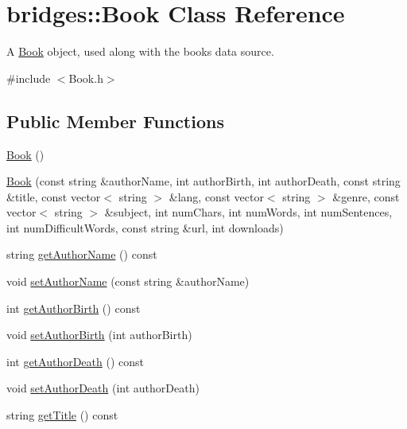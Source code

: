 \hypertarget{classbridges_1_1_book}{}\section{bridges\+:\+:Book Class Reference}
\label{classbridges_1_1_book}


A \mbox{\hyperlink{classbridges_1_1_book}{Book}} object, used along with the books data source.  




{\ttfamily \#include $<$Book.\+h$>$}

\subsection*{Public Member Functions}
\begin{DoxyCompactItemize}
\item 
\mbox{\hyperlink{classbridges_1_1_book_abb2903c640bd263a2e077d52e12a773e}{Book}} ()
\item 
\mbox{\hyperlink{classbridges_1_1_book_a4256eb5015b42e511d950c45103cef63}{Book}} (const string \&author\+Name, int author\+Birth, int author\+Death, const string \&title, const vector$<$ string $>$ \&lang, const vector$<$ string $>$ \&genre, const vector$<$ string $>$ \&subject, int num\+Chars, int num\+Words, int num\+Sentences, int num\+Difficult\+Words, const string \&url, int downloads)
\item 
string \mbox{\hyperlink{classbridges_1_1_book_a1f25d71b565a1bf5c82f76cce5dcc537}{get\+Author\+Name}} () const
\item 
void \mbox{\hyperlink{classbridges_1_1_book_a4ca756815b519a0a4d1ae5d3b21aa2d2}{set\+Author\+Name}} (const string \&author\+Name)
\item 
int \mbox{\hyperlink{classbridges_1_1_book_ac2c02b94f40eaddc7a2cca3f90976093}{get\+Author\+Birth}} () const
\item 
void \mbox{\hyperlink{classbridges_1_1_book_adca4d6766fa0068e23926ae95ed8411f}{set\+Author\+Birth}} (int author\+Birth)
\item 
int \mbox{\hyperlink{classbridges_1_1_book_a449e48d10878833b2f983deb993124dc}{get\+Author\+Death}} () const
\item 
void \mbox{\hyperlink{classbridges_1_1_book_a044ad1b1b6418d7545c6f957b2757bcd}{set\+Author\+Death}} (int author\+Death)
\item 
string \mbox{\hyperlink{classbridges_1_1_book_a5eda2e13c3b5523498d42845219eb175}{get\+Title}} () const
\item 

\end{DoxyCompactItemize}

